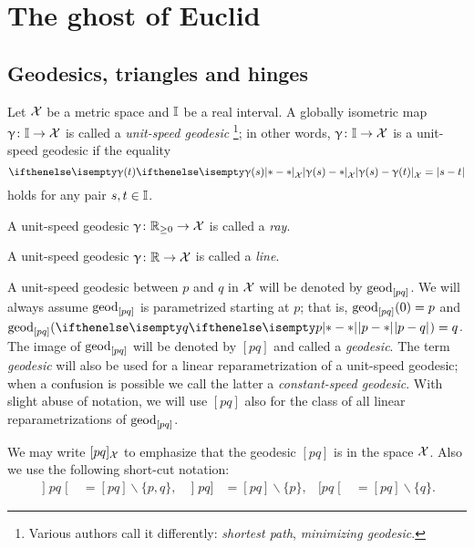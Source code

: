 \chapter{The ghost of Euclid
}

\section{Geodesics, triangles and hinges}
\label{sec:geods}

Let $\mathcal{X}$ be a metric space 
and $\II$\index{$\II$} be a real interval. 
A globally isometric map $\gamma\:\II\to \spc{X}$ is called a \emph{unit-speed geodesic}%
\footnote{Various authors call it differently: \emph{shortest path}, \emph{minimizing geodesic}.}; 
in other words, $\gamma\:\II\to \spc{X}$ is a unit-speed geodesic if the equality
\[\dist{\gamma(s)}{\gamma(t)}{\spc{X}}=|s-t|\]
holds for any pair $s,t\in \II$.

A unit-speed geodesic $\gamma\:\RR_{\ge0}\to \spc{X}$ is called a \emph{ray}.

A unit-speed geodesic  $\gamma\:\RR\to \spc{X}$ is called a \emph{line}.

A unit-speed geodesic between $p$ and $q$ in $\mathcal{X}$ will be denoted by $\mathrm{geod}_{[p q]}$\index{$\geod_{[{*}{*}]}$}.
We will always assume $\mathrm{geod}_{[p q]}$ is parametrized starting at $p$; 
that is, $\mathrm{geod}_{[p q]}(0)=p$ and $\geod_{[p q]}(\dist{p}{q}{})=q$.
The image of $\mathrm{geod}_{[p q]}$ will be denoted by $[p q]$\index{$[{*}{*}]$} and called a \emph{geodesic}.
The term \emph{geodesic} will also be used for  a linear reparametrization of a unit-speed geodesic;
when a confusion is possible we call the latter a \emph{constant-speed geodesic}.
With slight abuse of notation, we will use $[p q]$ also for the class of all linear reparametrizations of $\mathrm{geod}_{[p q]}$.

We may write $[p q]_{\mathcal{X}}$ 
to emphasize that the geodesic $[p q]$ is in the space  ${\mathcal{X}}$.
Also we use the following short-cut notation:
\begin{align*}
\mathopen{]} p q \mathclose{[}&=[pq]\backslash\{p,q\},
&
\mathopen{]} p q ]&=[pq]\backslash\{p\},
&
[ p q \mathclose{[}&=[pq]\backslash\{q\}.
\end{align*}

